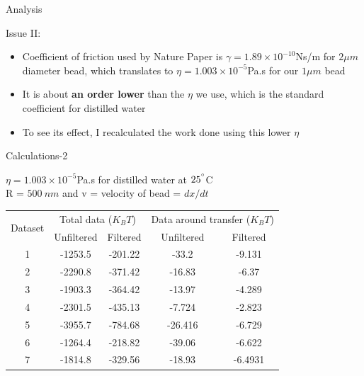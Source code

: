 \documentclass{beamer}
\begin{document}
\begin{frame}{Analysis}

Issue II:
\begin{itemize}
\item Coefficient of friction used by Nature Paper is $\gamma=1.89\times 10^{-10}$Ns/m for $2 \mu m$ diameter bead, which translates to $\eta=1.003\times 10^{-5}$Pa.s for our $1 \mu m$ bead
\item It is about \textbf{an order lower} than the $\eta$ we use, which is the standard coefficient for distilled water
\item To see its effect, I recalculated the work done using this lower $\eta$
\end{itemize}

\end{frame}
\begin{frame}{Calculations-2}

$\eta=1.003 \times 10^{-5}$Pa.s for distilled water at $25^{\degree}$C\\
R = $500~nm$ and v = velocity of bead = $dx/dt$
\begin{table}
  \begin{tabular}{|c|c|c|c|c|}
    \hline
    \multirow{2}{*}{Dataset} &
      \multicolumn{2}{c|}{Total data ($K_BT$)} &
      \multicolumn{2}{c|}{Data around transfer ($K_BT$)} \\
      
    & Unfiltered & Filtered & Unfiltered & Filtered \\
    \hline
    1 & -1253.5 & -201.22 & -33.2 & -9.131  \\
    \hline
    2 & -2290.8 & -371.42 & -16.83 & -6.37  \\
    \hline
    3 & -1903.3 & -364.42 & -13.97 & -4.289  \\
    \hline
    4 & -2301.5 & -435.13 & -7.724 & -2.823 \\
    \hline
    5 & -3955.7 & -784.68 & -26.416 & -6.729  \\
    \hline
    6 & -1264.4 & -218.82 & -39.06 & -6.622 \\
    \hline
    7 & -1814.8 & -329.56 & -18.93 & -6.4931  \\
    \hline
    
  \end{tabular}
\end{table}


\end{frame}
\end{document}
